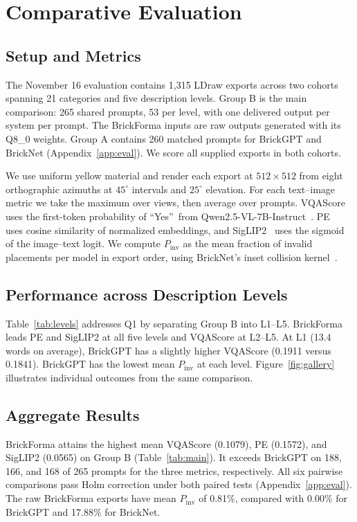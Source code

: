 \section{Comparative Evaluation}
\label{sec:eval}
\subsection{Setup and Metrics}
\label{sec:setup}
The November 16 evaluation contains 1,315 LDraw exports across two cohorts spanning 21 categories and five description levels. Group B is the main comparison: 265 shared prompts, 53 per level, with one delivered output per system per prompt. The BrickForma inputs are raw outputs generated with its Q8\_0 weights. Group A contains 260 matched prompts for BrickGPT and BrickNet (Appendix~\ref{app:eval}). We score all supplied exports in both cohorts.

We use uniform yellow material and render each export at $512{\times}512$ from eight orthographic azimuths at $45^\circ$ intervals and $25^\circ$ elevation. For each text--image metric we take the maximum over views, then average over prompts. VQAScore~\cite{vqascore} uses the first-token probability of \textquotedblleft Yes\textquotedblright\ from Qwen2.5-VL-7B-Instruct~\cite{qwen25vl}. PE~\cite{pe} uses cosine similarity of normalized embeddings, and SigLIP2~\cite{siglip2} uses the sigmoid of the image--text logit. We compute $P_{\mathrm{inv}}$ as the mean fraction of invalid placements per model in export order, using BrickNet's inset collision kernel~\cite{bricknet}.

\subsection{Performance across Description Levels}
Table~\ref{tab:levels} addresses Q1 by separating Group B into L1--L5. BrickForma leads PE and SigLIP2 at all five levels and VQAScore at L2--L5. At L1 (13.4 words on average), BrickGPT has a slightly higher VQAScore (0.1911 versus 0.1841). BrickGPT has the lowest mean $P_{\mathrm{inv}}$ at each level. Figure~\ref{fig:gallery} illustrates individual outcomes from the same comparison.


\subsection{Aggregate Results}

BrickForma attains the highest mean VQAScore (0.1079), PE (0.1572), and SigLIP2 (0.0565) on Group B (Table~\ref{tab:main}). It exceeds BrickGPT on 188, 166, and 168 of 265 prompts for the three metrics, respectively. All six pairwise comparisons pass Holm correction under both paired tests (Appendix~\ref{app:eval}). The raw BrickForma exports have mean $P_{\mathrm{inv}}$ of 0.81\%, compared with 0.00\% for BrickGPT and 17.88\% for BrickNet.

